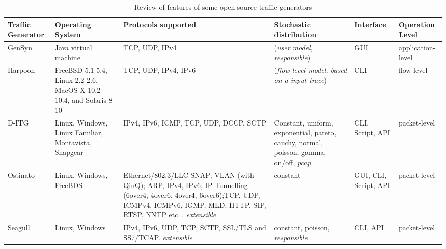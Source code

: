 \begin{table}[t!]
\caption{Review of features of some open-source traffic generators}
\begin{center}
\begin{footnotesize}
\begin{tabularx}{\linewidth}{
|>{\hsize=0.9\hsize\raggedright\arraybackslash}X	%
|>{\hsize=1.16\hsize\centering\arraybackslash}X					%
>{\hsize=1.37\hsize\centering\arraybackslash}X					%
>{\hsize=1.16\hsize\centering\arraybackslash}X					%
>{\hsize=0.7\hsize\centering\arraybackslash}X					%
>{\hsize=0.7\hsize\centering\arraybackslash}X|					%
}
	\hline
	\textbf{Traffic Generator} & 
    \textbf{Operating System} & 
    \textbf{Protocols supported} & 
    \textbf{Stochastic distribution} & 
    \textbf{Interface} & 
    \textbf{Operation Level} \\
    
    \hline
    GenSyn	&
    Java virtual machine &
    TCP, UDP, IPv4 &
    (\textit{user model}, \textit{responsible}) &
    GUI &
    application-level \\
    			
    \hline
    Harpoon &
    FreeBSD 5.1-5.4, Linux 2.2-2.6, MacOS X 10.2-10.4, and Solaris 8-10 &
    TCP, UDP, IPv4, IPv6 &
    (\textit{flow-level model, based on a input trace})&
    CLI &
    flow-level\\    

    \hline
    D-ITG &
    Linux, Windows, Linux Familiar, Montavista, Snapgear &
    IPv4, IPv6, ICMP, TCP, UDP, DCCP, SCTP &
    Constant, uniform, exponential, pareto, cauchy, normal, poisson, gamma, on/off, \textit{pcap}&
    CLI, Script, API &
    packet-level \\
    
    \hline
    Ostinato &
    Linux, Windows, FreeBDS &
    Ethernet/802.3/LLC SNAP; VLAN (with QinQ); ARP, IPv4, IPv6, IP Tunnelling (6over4, 4over6, 4over4, 6over6);TCP, UDP, ICMPv4, ICMPv6, IGMP, MLD; HTTP, SIP, RTSP, NNTP etc... \textit{extensible}&
    constant &
    GUI, CLI, Script, API &
    packet-level\\
	 		
    \hline
    Seagull&
    Linux, Windows &
    IPv4, IPv6, UDP, TCP, SCTP, SSL/TLS and SS7/TCAP. \textit{extensible}&
    constant, poisson, \textit{responsible} &
    CLI, API &
    packet-level\\




\end{tabularx}
\end{footnotesize}
\end{center}
\end{table}
